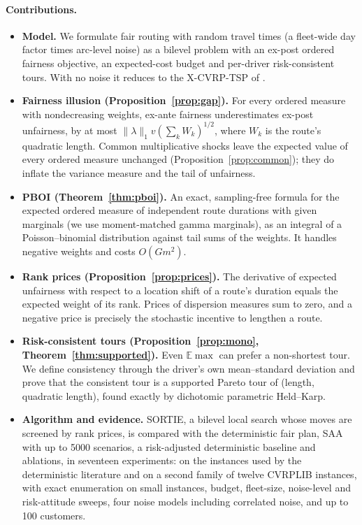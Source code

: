 \documentclass[11pt]{article}
\theoremstyle{definition}
\newcommand{\E}{\mathbb{E}}
\begin{document}
\paragraph{Contributions.}
\begin{itemize}
\item \textbf{Model.} We formulate fair routing with random travel times
(a fleet-wide day factor times arc-level noise) as a bilevel problem with an
ex-post ordered fairness objective, an expected-cost budget and per-driver
risk-consistent tours. With no noise it reduces to the X-CVRP-TSP of
\citet{ljubic2026fair}.
\item \textbf{Fairness illusion (Proposition~\ref{prop:gap}).} For every
ordered measure with nondecreasing weights, ex-ante fairness underestimates
ex-post unfairness, by at most $\|\lambda\|_1 v (\sum_k W_k)^{1/2}$, where
$W_k$ is the route's quadratic length. Common multiplicative shocks leave the
expected value of every ordered measure unchanged
(Proposition~\ref{prop:common}); they do inflate the variance measure and the
tail of unfairness.
\item \textbf{PBOI (Theorem~\ref{thm:pboi}).} An exact, sampling-free formula for
the expected ordered measure of independent route durations with given
marginals (we use moment-matched gamma marginals), as an integral
of a Poisson--binomial distribution against tail sums of the weights. It
handles negative weights and costs $O(Gm^2)$.
\item \textbf{Rank prices (Proposition~\ref{prop:prices}).} The derivative of expected
unfairness with respect to a location shift of a route's duration equals the
expected weight of its rank. Prices of dispersion measures sum to zero, and a negative price is
precisely the stochastic incentive to lengthen a route.
\item \textbf{Risk-consistent tours (Proposition~\ref{prop:mono}, Theorem~\ref{thm:supported}).}
Even $\E\max$ can prefer a non-shortest tour. We define consistency through the
driver's own mean--standard deviation and prove that the consistent tour is a
supported Pareto tour of (length, quadratic length), found exactly by
dichotomic parametric Held--Karp.
\item \textbf{Algorithm and evidence.} SORTIE, a bilevel local search whose
moves are screened by rank prices, is compared with the deterministic fair plan,
SAA with up to 5000 scenarios, a risk-adjusted deterministic baseline and
ablations, in seventeen experiments: on the instances used by the
deterministic literature and on a second family of twelve CVRPLIB instances,
with exact enumeration on small instances, budget, fleet-size, noise-level
and risk-attitude sweeps, four noise models including correlated noise, and
up to 100 customers.
\end{itemize}
\end{document}
